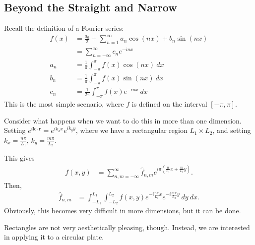 \documentclass[10pt]{mypackage}
\begin{document}
  \subsection{Beyond the Straight and Narrow}%
  Recall the definition of a Fourier series:
  \begin{align*}
    f(x) &= \frac{a_0}{2} + \sum_{n=1}^{\infty}a_n\cos\left( nx \right) + b_n\sin\left( nx \right)\\
         &= \sum_{n=-\infty}^{\infty}c_ne^{-inx}\\
    a_n &= \frac{1}{\pi}\int_{-\pi}^{\pi} f(x)\cos\left( nx \right)\:dx\\
    b_n &= \frac{1}{\pi} \int_{-\pi}^{\pi} f(x)\sin\left( nx \right)\:dx\\
    c_n &= \frac{1}{2\pi}\int_{-\pi}^{\pi} f(x)e^{-inx}\:dx
  \end{align*}
  This is the most simple scenario, where $f$ is defined on the interval $\left[ -\pi,\pi \right]$.\newline

  Consider what happens when we want to do this in more than one dimension. Setting $e^{i\mathbf{k}\cdot \mathbf{r}} = e^{ik_x x}e^{ik_y y}$, where we have a rectangular region $L_1\times L_2$, and setting $k_x = \frac{n\pi}{L_1}$, $k_y = \frac{m\pi}{L_2}$.\newline

  This gives
  \begin{align*}
    f(x,y) &= \sum_{n,m=-\infty}^{\infty} \hat{f}_{n,m} e^{i\pi \left( \frac{n}{L_1}x + \frac{m}{L_2}y \right)}.
  \end{align*}
  Then,
  \begin{align*}
    \hat{f}_{n,m} &= \int_{-L_1}^{L_1}\int_{-L_2}^{L_2} f(x,y)e^{-i\frac{n\pi}{L_1}x}e^{-i\frac{m\pi}{L_2}y}\:dy\:dx.
  \end{align*}
  Obviously, this becomes very difficult in more dimensions, but it can be done.\newline

  Rectangles are not very aesthetically pleasing, though. Instead, we are interested in applying it to a circular plate.\newline
\end{document}
